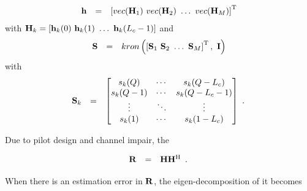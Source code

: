 \documentclass[a4paper,10pt,fleqn, twocolumn]{IEEEtran}
\newcommand{\bh}{{\bf h}}
\newcommand{\bH}{{\bf H}}
\newcommand{\bS}{{\bf S}}
\newcommand{\bI}{{\bf I}}
\newcommand{\bR}{{\bf R}}
\begin{document}
\begin{equation}\hspace{-0.00in}
\begin{array}{rcl}
\bh&=&\left[\mbox{vec}(\bH_{1})\ \mbox{vec}(\bH_{2})\ \ldots\
\mbox{vec}(\bH_{M})\right]^{\rm T}
\end{array}
\end{equation}
\noindent with $\bH_{k}=\left[\bh_{k}(0)\ \bh_{k}(1)\ \ldots\
\bh_{k}(L_{c}-1)\right]$ and
\begin{equation}\hspace{-0.00in}
\begin{array}{rcl}
\bS&=&\mbox{kron}\left(\left[\bS_{1}\ \bS_{2}\ \ldots\
\bS_{M}\right]^{\rm T},\ \bI\right)
\end{array}
\end{equation}
\noindent with
\begin{equation}\hspace{-0.10in}
\begin{array}{rcl}
\bS_{k}&=&\left[\begin{matrix}
s_{k}(Q)&\cdots&s_{k}(Q-L_{c})\\
s_{k}(Q-1)&\cdots&s_{k}(Q-L_{c}-1)\\
\vdots&\ddots&\vdots\\
s_{k}(1)&\cdots&s_{k}(1-L_{c})
\end{matrix}\right]
\end{array}.
\end{equation}

Due to pilot design and channel impair,  the

\begin{equation}\hspace{-0.10in}
\begin{array}{rcl}
\bR&=&\bH\bH^{\rm H}
\end{array}.
\end{equation}

When there is an estimation error in $\bR$, the
eigen-decomposition of it becomes
\end{document}
